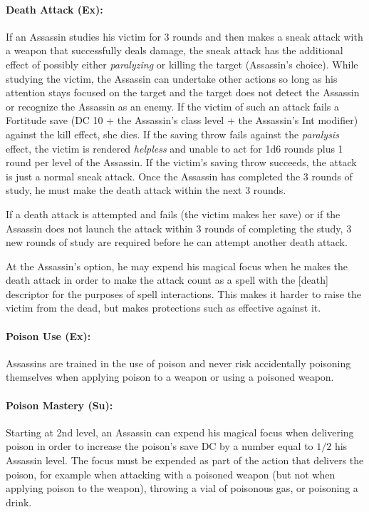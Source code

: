 \paragraph{Death Attack (Ex):}
If an Assassin studies his victim for 3 rounds and then makes a sneak attack with a weapon that successfully deals damage, 
the sneak attack has the additional effect of possibly either \emph{paralyzing} or killing the target (Assassin's choice). 
While studying the victim, the Assassin can undertake other actions so long as his attention stays focused on the target 
and the target does not detect the Assassin or recognize the Assassin as an enemy. 
If the victim of such an attack fails a Fortitude save (DC 10 + the Assassin's class level + the Assassin's Int modifier) 
against the kill effect, she dies. If the saving throw fails against the \emph{paralysis} effect, 
the victim is rendered \emph{helpless} and unable to act for 1d6 rounds plus 1 round per level of the Assassin. 
If the victim's saving throw succeeds, the attack is just a normal sneak attack. 
Once the Assassin has completed the 3 rounds of study, he must make the death attack within the next 3 rounds.

If a death attack is attempted and fails (the victim makes her save) 
or if the Assassin does not launch the attack within 3 rounds of completing the study, 
3 new rounds of study are required before he can attempt another death attack.

At the Assassin's option, he may expend his magical focus when he makes the death attack 
in order to make the attack count as a spell with the [death] descriptor for the purposes of spell interactions.
This makes it harder to raise the victim from the dead, but makes protections such as  effective against it.
\paragraph{Poison Use (Ex):}
Assassins are trained in the use of poison and never risk accidentally poisoning themselves when applying poison to a weapon or using a poisoned weapon.

\paragraph{Poison Mastery (Su):}
Starting at 2nd level, an Assassin can expend his magical focus when delivering poison in order to increase the poison's save DC by a number equal to $1/2$ his Assassin level.
The focus must be expended as part of the action that delivers the poison, for example when attacking with a poisoned weapon (but not when applying poison to the weapon),
throwing a vial of poisonous gas, or poisoning a drink.
